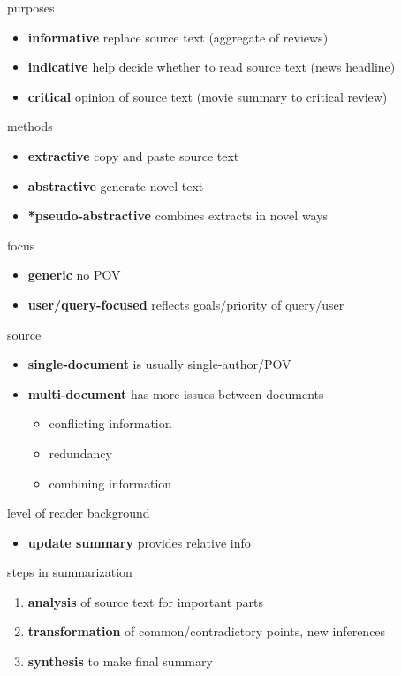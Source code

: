 \documentclass[]{article}
\theoremstyle{definition}
\begin{document}
purposes
\begin{itemize}
    \item \textbf{informative} replace source text (aggregate of reviews)
    \item \textbf{indicative} help decide whether to read source text (news headline)
    \item \textbf{critical} opinion of source text (movie summary to critical review)
\end{itemize}

methods
\begin{itemize}
    \item \textbf{extractive} copy and paste source text
    \item \textbf{abstractive} generate novel text
    \item \textbf{*pseudo-abstractive} combines extracts in novel ways
\end{itemize}

focus
\begin{itemize}
    \item \textbf{generic} no POV
    \item \textbf{user/query-focused} reflects goals/priority of query/user
\end{itemize}

source
\begin{itemize}
    \item \textbf{single-document} is usually single-author/POV
    \item \textbf{multi-document} has more issues between documents
        \begin{itemize}
            \item conflicting information
            \item redundancy
            \item combining information
        \end{itemize}

\end{itemize}

level of reader background
\begin{itemize}
    \item \textbf{update summary} provides relative info
\end{itemize}


steps in summarization
\begin{enumerate}
    \item \textbf{analysis} of source text for important parts
    \item \textbf{transformation} of common/contradictory points, new inferences
    \item \textbf{synthesis} to make final summary
\end{enumerate}
\end{document}
